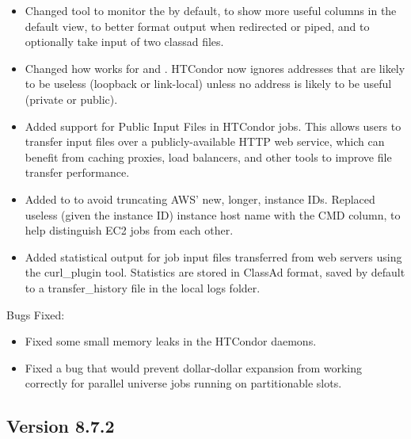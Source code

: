 \begin{itemize}

\item Changed  tool
to monitor the  by default,
to show more useful columns in the default view,
to better format output when redirected or piped, and
to optionally take input of two classad files.

\item Changed how  works for  and
.  HTCondor now ignores addresses that are likely
to be useless (loopback or link-local) unless no address is likely to be
useful (private or public).

\item Added support for Public Input Files in HTCondor jobs. This allows
users to transfer input files over a publicly-available HTTP web service,
which can benefit from caching proxies, load balancers, and other tools
to improve file transfer performance.

\item Added  to  to avoid truncating AWS' new,
longer, instance IDs.  Replaced useless (given the instance ID) instance
host name with the CMD column, to help distinguish EC2 jobs from each other.

\item Added statistical output for job input files transferred from web servers
using the curl\_plugin tool. Statistics are stored in ClassAd format, saved by
default to a transfer\_history file in the local logs folder.

\end{itemize}

\noindent Bugs Fixed:

\begin{itemize}

\item Fixed some small memory leaks in the HTCondor daemons.

\item Fixed a bug that would prevent dollar-dollar expansion from
working correctly for parallel universe jobs running on partitionable
slots.

\end{itemize}

\subsection*{\label{sec:New-8-7-2}Version 8.7.2}

